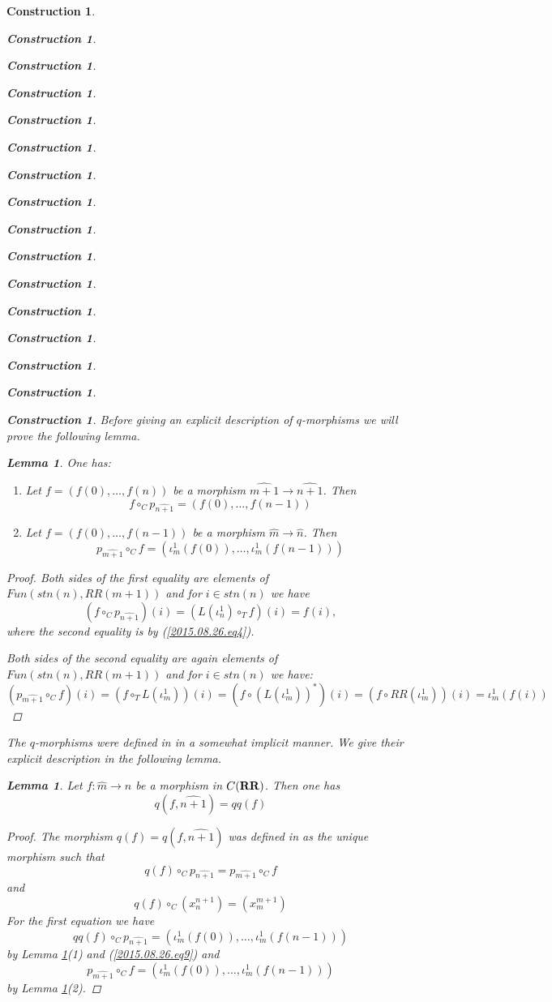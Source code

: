 \documentclass[12pt]{amsart}
\newtheorem{lemma}[proposition]{Lemma}
\newtheorem{construction}[proposition]{Construction}
\newcommand{\llabel}[1]{\label{#1}}
\newcommand{\sr}{\rightarrow}
\newcommand{\wh}{\widehat}
\newcommand{\mbind}[1]{{#1^*}}
\newcommand{\RR}{{\bf RR}}
\begin{document}
\begin{construction}
\begin{construction}
\begin{construction}
\begin{construction}
\begin{construction}
\begin{construction}
\begin{construction}
\begin{construction}
\begin{construction}
\begin{construction}
\begin{construction}
\begin{construction}
\begin{construction}
\begin{construction}
\begin{construction}
\begin{construction}
Before giving an explicit description of $q$-morphisms we will prove the
following lemma.
%
\begin{lemma}
\llabel{2015.07.24.l1}
One has:
%
\begin{enumerate}
\item Let $f=(f(0),\dots,f(n))$ be a morphism $\wh{m+1}\sr\wh{n+1}$. Then 
%
$$f\circ_C p_{\wh{n+1}}=(f(0),\dots,f(n-1))$$
%
\item Let $f=(f(0),\dots,f(n-1))$ be a morphism $\wh{m}\sr \wh{n}$. Then 
%
$$p_{\wh{m+1}}\circ_C f=(\iota_m^1(f(0)),\dots,\iota_m^1(f(n-1)))$$
%
\end{enumerate}
\end{lemma}
%
\begin{proof}
Both sides of the first equality are elements of $Fun(stn(n), RR(m+1))$ and for $i\in stn(n)$ we have
%
$$(f\circ_C p_{\wh{n+1}})(i)=(L(\iota_{n}^1)\circ_T f)(i)=f(i),$$
%
where the second equality is by (\ref{2015.08.26.eq4}). 

Both sides of the second equality are again elements of $Fun(stn(n), RR(m+1))$
and for $i\in stn(n)$ we have:
%
$$(p_{\wh{m+1}}\circ_C f)(i)=(f\circ_T L(\iota_{m}^1))(i)=(f\circ \mbind{(L(\iota_{m}^1))})(i)=(f\circ RR(\iota_{m}^1))(i)=\iota_{m}^1(f(i))$$
%
\end{proof}
%
The $q$-morphisms were defined in \cite{LandC} in a somewhat implicit
manner. We give their explicit description in the following lemma.
%
\begin{lemma}
\llabel{2016.01.15.l3}
Let $f:\wh{m}\sr \wh{n}$ be a morphism in $C(\RR)$. Then one has
%
$$q(f,\wh{n+1})=qq(f)$$
%
\end{lemma}
%
\begin{proof}
The morphism $q(f)=q(f,\wh{n+1})$ was defined in \cite{LandC} as the unique
morphism such that
%
$$q(f)\circ_C p_{\wh{n+1}}=p_{\wh{m+1}}\circ_C f$$
%
and
%
$$q(f)\circ_C (x_n^{n+1})=(x_m^{m+1})$$
%
For the first equation we have
%
$$qq(f)\circ_C p_{\wh{n+1}}=(\iota_m^1(f(0)),\dots,\iota_m^1(f(n-1)))$$
%
by Lemma \ref{2015.07.24.l1}(1) and (\ref{2015.08.26.eq9}) and
%
$$p_{\wh{m+1}}\circ_C f = (\iota_m^1(f(0)),\dots,\iota_m^1(f(n-1)))$$
%
by Lemma \ref{2015.07.24.l1}(2).


\end{proof}
\end{construction}
\end{construction}
\end{construction}
\end{construction}
\end{construction}
\end{construction}
\end{construction}
\end{construction}
\end{construction}
\end{construction}
\end{construction}
\end{construction}
\end{construction}
\end{construction}
\end{construction}
\end{construction}
\end{document}
